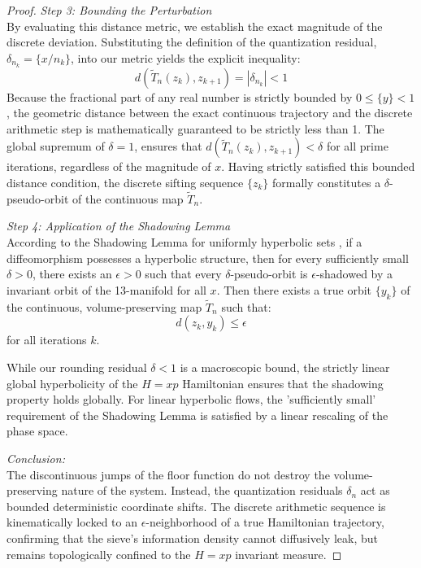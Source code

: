 \documentclass[sn-mathphys-num, pdflatex]{sn-jnl}
\begin{document}
\begin{proof}
\textit{Step 3: Bounding the Perturbation}\\
By evaluating this distance metric, we establish the exact magnitude of the discrete deviation. Substituting the definition of the quantization residual, $\delta_{n_k} = \{x/n_k\}$, into our metric yields the explicit inequality:
\begin{equation}
d(\tilde{T}_n(z_k), z_{k+1}) = |\delta_{n_k}| < 1
\end{equation}
Because the fractional part of any real number is strictly bounded by $0 \le \{y\} < 1$, the geometric distance between the exact continuous trajectory and the discrete arithmetic step is mathematically guaranteed to be strictly less than 1. The global supremum of $\delta = 1$, ensures that $d(\tilde{T}_n(z_k), z_{k+1}) < \delta$ for all prime iterations, regardless of the magnitude of $x$. Having strictly satisfied this bounded distance condition, the discrete sifting sequence $\{z_k\}$ formally constitutes a $\delta$-pseudo-orbit of the continuous map $\tilde{T}_n$.

\textit{Step 4: Application of the Shadowing Lemma}\\
According to the Shadowing Lemma for uniformly hyperbolic sets \cite{katok1995modern}, if a diffeomorphism possesses a hyperbolic structure, then for every sufficiently small $\delta > 0$, there exists an $\epsilon > 0$ such that every $\delta$-pseudo-orbit is $\epsilon$-shadowed by a invariant orbit of the 13-manifold for all $x$. Then there exists a true orbit $\{y_k\}$ of the continuous, volume-preserving map $\tilde{T}_n$ such that:
\begin{equation}
d(z_k, y_k) \le \epsilon
\end{equation}
for all iterations $k$. 

While our rounding residual $\delta < 1$ is a macroscopic bound, the strictly linear global hyperbolicity of the $H=xp$ Hamiltonian ensures that the shadowing property holds globally. For linear hyperbolic flows, the 'sufficiently small' requirement of the Shadowing Lemma  is satisfied by a linear rescaling of the phase space.  

\textit{Conclusion:}\\
The discontinuous jumps of the floor function do not destroy the volume-preserving nature of the system. Instead, the quantization residuals $\delta_n$ act as bounded deterministic coordinate shifts. The discrete arithmetic sequence is kinematically locked to an $\epsilon$-neighborhood of a true Hamiltonian trajectory, confirming that the sieve's information density cannot diffusively leak, but remains topologically confined to the $H=xp$ invariant measure.
\end{proof}
\end{document}
